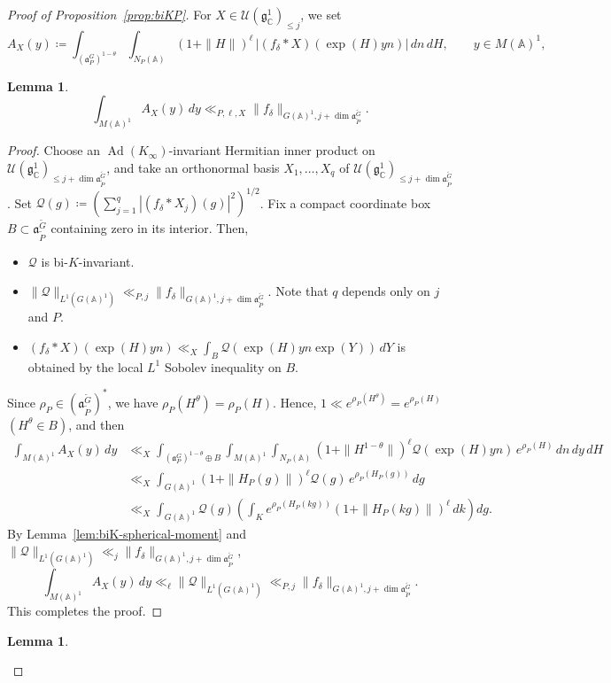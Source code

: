 \documentclass[12pt]{amsart}
\theoremstyle{definition}
\theoremstyle{plain}
\newtheorem{lemma}[definition]{Lemma}
\theoremstyle{remark}
\def\C{\mathbb{C}}%
\def\A{\mathbb{A}}%
\DeclareMathOperator{\Ad}{Ad}%
\newcommand{\fa}{\mathfrak{a}}
\newcommand{\fg}{\mathfrak{g}}
\newcommand{\cQ}{\mathcal{Q}}
\newcommand{\cU}{\mathcal{U}}
\numberwithin{equation}{section}
\newcommand{\tG}{\widetilde{G}}
\newcommand{\tP}{\widetilde{P}}
\begin{document}
\begin{proof}[Proof of Proposition~\ref{prop:biKP}]
For $X\in\mathcal U(\mathfrak g_\C^1)_{\le j}$, we set
\[
A_X(y)\coloneqq
\int_{(\fa_P^G)^{1-\theta}}\int_{N_P(\A)}
(1+\|H\|)^\ell \, \bigl|(f_\delta*X)(\exp(H)yn)\bigr|\,dn\,dH,
\qquad y\in M(\A)^1,
\]
\begin{lemma}\label{lem:biK-absolute-global}
\begin{equation*}
\int_{M(\A)^1}A_X(y)\,dy
\ll_{P,\ell,X} \|f_\delta\|_{G(\A)^1,j+\dim\fa_{\tP}^{\tG}}.
\end{equation*}    
\end{lemma}
\begin{proof}
Choose an $\Ad(K_\infty)$-invariant Hermitian inner product on $\cU(\fg^1_\C)_{\le j+\dim\fa_{\tP}^{\tG}}$, and take an orthonormal basis $X_1,\dots,X_q$ of $\cU(\fg^1_\C)_{\le j+\dim\fa_{\tP}^{\tG}}$. 
Set $\cQ(g)\coloneqq (\sum_{j=1}^q|(f_\delta*X_j)(g)|^2)^{1/2}$. 
Fix a compact coordinate box $B\subset \fa_{\tP}^{\tG}$ containing zero in its interior.
Then,
\begin{itemize}
    \item $\cQ$ is bi-$K$-invariant.
    \item $\|\cQ\|_{L^1(G(\A)^1)}\ll_{P,j} \|f_\delta\|_{G(\A)^1,j+\dim\fa_{\tP}^{\tG}}$. Note that $q$ depends only on $j$ and $P$. 
    \item $(f_\delta*X)(\exp(H)yn)\ll_X \int_B\cQ(\exp(H)yn\exp(Y))\, dY $ is obtained by the local $L^1$ Sobolev inequality on $B$. 
\end{itemize}
Since $\rho_P\in (\fa_{\tP}^{\tG})^*$, we have $\rho_P(H^\theta)=\rho_P(H)$. 
Hence, $1\ll e^{\rho_P(H^{\theta})}=e^{\rho_P(H)}$ $(H^\theta\in B)$, and then
\begin{align*}
\int_{M(\A)^1}A_X(y)\,dy&\ll_{X} \int_{(\fa_P^G)^{1-\theta}\oplus B} \int_{M(\A)^1}\int_{N_P(\A)}(1+\|H^{1-\theta}\|)^\ell \cQ(\exp(H)yn)\, e^{\rho_P(H)} \, dn \, dy \, dH \\
&\ll_{X}  \int_{G(\A)^1}(1+\|H_P(g)\|)^\ell \cQ(g)\, e^{\rho_P(H_P(g))} \, dg\\
&\ll_{X} \int_{G(\A)^1}\cQ(g) \left(\int_K e^{\rho_P(H_P(kg))}(1+\|H_P(kg)\|)^\ell\,dk\right)dg.
\end{align*}
By Lemma~\ref{lem:biK-spherical-moment} and $\|\cQ\|_{L^1(G(\A)^1)}\ll_{j} \|f_\delta\|_{G(\A)^1,j+\dim\fa_{\tP}^{\tG}}$, 
\[
\int_{M(\A)^1}A_X(y)\,dy 
\ll_{\ell}\|\cQ\|_{L^1(G(\A)^1)} \ll_{P,j} \|f_\delta\|_{G(\A)^1,j+\dim\fa_{\tP}^{\tG}}.
\]
This completes the proof.
\end{proof}
\begin{lemma}\label{lem:biK-absolute-pointwise}

\end{lemma}
\end{proof}
\end{document}
